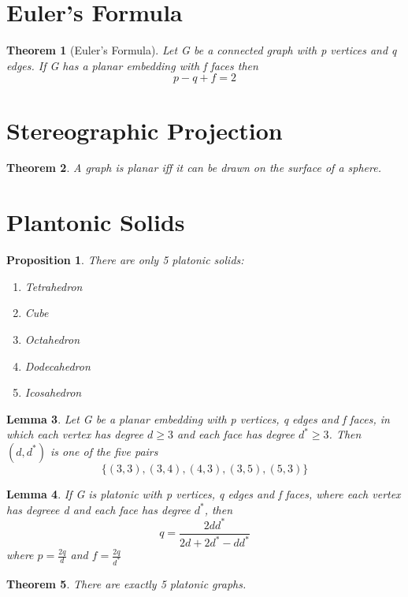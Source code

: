 \documentclass[11pt, oneside]{book}
\theoremstyle{break}
\newtheorem{thm}{Theorem}[section]
\newtheorem{lemma}[thm]{Lemma}
\newtheorem{propo}{Proposition}[section]
\begin{document}
\section{Euler's Formula}

\begin{thm}[Euler's Formula]
	Let G be a connected graph with p vertices and q edges. If G has a planar embedding with f faces then
	\[
		p - q + f = 2
	\]
\end{thm}


\section{Stereographic Projection}

\begin{thm}
	A graph is planar iff it can be drawn on the surface of a sphere.
\end{thm}


\section{Plantonic Solids}

\begin{propo}
	There are only 5 platonic solids:
	\begin{enumerate}
		\item Tetrahedron
		\item Cube
		\item Octahedron
		\item Dodecahedron
		\item Icosahedron
	\end{enumerate}
\end{propo}

\begin{lemma}
	Let G be a planar embedding with p vertices, q edges and f faces, in which each vertex has degree $d \geq 3$ and each face has degree $d^* \geq 3$. Then $(d, d^*)$ is one of the five pairs
	\[
		\{(3, 3), (3, 4), (4, 3), (3, 5), (5, 3)\}
	\]
\end{lemma}

\begin{lemma}
	If G is platonic with p vertices, q edges and f faces, where each vertex has degreee d and each face has degree $d^*$, then
	\[
		q = \frac{2dd^*}{2d + 2d^* -dd^*}
	\]
	where $p=\frac{2q}{d}$ and $f = \frac{2q}{d^*}$
\end{lemma}

\begin{thm}
	There are exactly 5 platonic graphs.
\end{thm}
\end{document}
